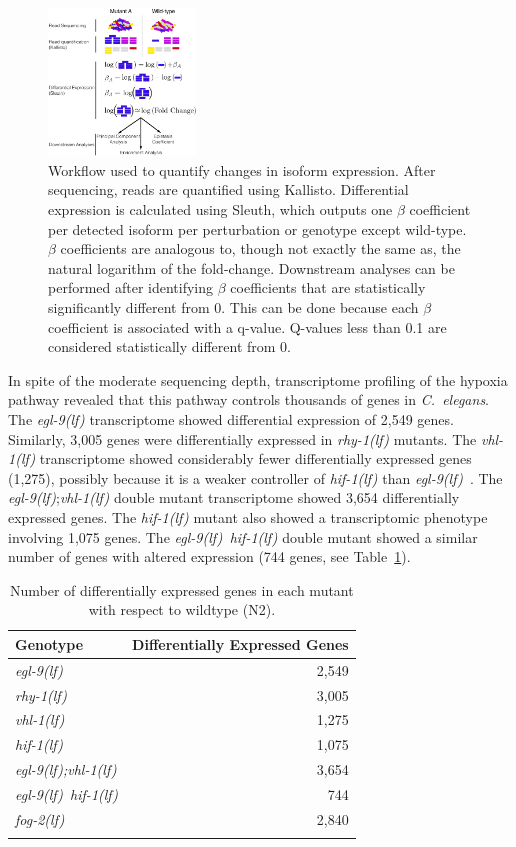 \documentclass[9pt,twocolumn,twoside,lineno]{pnas-new}
\newcommand{\cel}{\emph{C.~elegans}}
\newcommand{\fog}{\emph{\mbox{fog-2(lf)}}}
\newcommand{\egl}{\emph{\mbox{egl-9}(lf)}}
\newcommand{\rhy}{\emph{\mbox{rhy-1}(lf)}}
\newcommand{\vhl}{\emph{\mbox{vhl-1}(lf)}}
\newcommand{\eglvhl}{\emph{\mbox{egl-9(lf);vhl-1(lf)}}}
\newcommand{\eglhif}{\emph{\mbox{egl-9(lf)}~\mbox{hif-1(lf)}}}
\newcommand{\hif}{\emph{\mbox{hif-1(lf)}}}
\newcommand{\egln}{2,549}
\newcommand{\rhyn}{3,005}
\newcommand{\vhln}{1,275}
\newcommand{\eglvhln}{3,654}
\newcommand{\hifn}{1,075}
\newcommand{\eglhifn}{744}
\newcommand{\fogn}{2,840}
\begin{document}
\begin{figure}[tbhp]
\centering
\includegraphics[width=0.35\textwidth]{../figs/meaningofbeta.pdf}
\caption{
Workflow used to quantify changes in isoform expression.
After sequencing, reads are quantified using Kallisto. Differential
expression is calculated using Sleuth, which outputs one $\beta$ coefficient per
detected isoform per perturbation or genotype except wild-type. $\beta$ coefficients
are analogous to, though not exactly the same as, the natural logarithm of the
fold-change. Downstream analyses can be performed after identifying $\beta$ coefficients
that are statistically significantly different from 0. This can be done because
each $\beta$ coefficient is associated with a q-value. Q-values less than 0.1 are
considered statistically different from 0.
}
\label{fig:explain}
\end{figure}

In spite of the moderate sequencing depth, transcriptome profiling of the hypoxia
pathway revealed that this pathway controls thousands of genes in \cel{}. The
\egl{} transcriptome showed differential expression of \egln{} genes. Similarly,
\rhyn{} genes were differentially expressed in \rhy{} mutants. The \vhl{}
transcriptome showed considerably fewer differentially expressed genes (\vhln{}),
possibly because it is a weaker controller of \hif{} than
\egl{}~\cite{Shao2009}. The \egl{};\vhl{} double mutant transcriptome showed
\eglvhln{} differentially expressed genes. The \hif{} mutant also showed a
transcriptomic phenotype involving \hifn{} genes. The \eglhif{} double mutant
showed a similar number of genes with altered expression (\eglhifn{} genes, see
Table~\ref{tab:genes}).


\begin{table}[tbhp]
  \centering
  \begin{tabular}{lr}
    \toprule{}
    Genotype & Differentially Expressed Genes\\
    \midrule{}\egl{} & \egln{}\\
    \rhy{} & \rhyn{}\\
    \vhl{} & \vhln{}\\
    \hif{} & \hifn{}\\
    \eglvhl{} & \eglvhln{}\\
    \eglhif{} & \eglhifn{}\\
    \fog{} & \fogn{}\\
    \bottomrule{}
  \end{tabular}
  \caption{Number of differentially expressed genes in each mutant with respect
  to wildtype (N2).}
\label{tab:genes}
\end{table}
\end{document}
